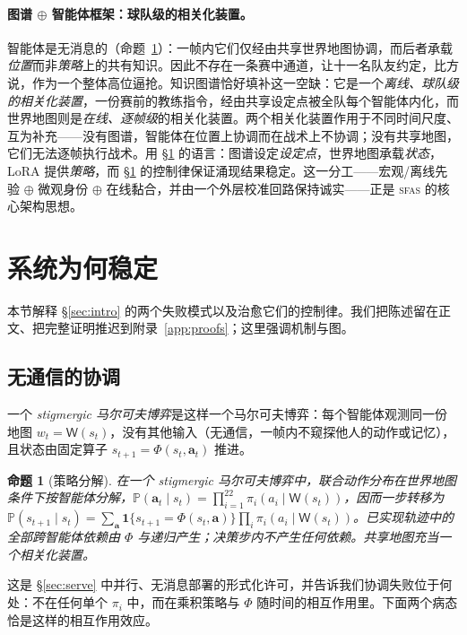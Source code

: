 \documentclass[11pt,UTF8,fontset=fandol]{ctexart}
\newcommand{\Prob}{\mathbb{P}}
\newcommand{\Wmap}{\mathsf{W}}
\newcommand{\sfas}{\textsc{sfas}}
\theoremstyle{plain}
\newtheorem{proposition}{命题}
\theoremstyle{definition}
\theoremstyle{remark}
\begin{document}
\paragraph{图谱 $\oplus$ 智能体框架：球队级的相关化装置。} 智能体是无消息的（命题~\ref{prop:factor}）：一帧内它们仅经由共享世界地图协调，而后者承载\emph{位置}而非\emph{策略}上的共有知识。因此不存在一条赛中通道，让十一名队友约定，比方说，作为一个整体高位逼抢。知识图谱恰好填补这一空缺：它是一个\emph{离线、球队级的相关化装置}，一份赛前的教练指令，经由共享设定点被全队每个智能体内化，而世界地图则是\emph{在线、逐帧级}的相关化装置。两个相关化装置作用于不同时间尺度、互为补充——没有图谱，智能体在位置上协调而在战术上不协调；没有共享地图，它们无法逐帧执行战术。用 \S\ref{sec:why} 的语言：图谱设定\emph{设定点}，世界地图承载\emph{状态}，LoRA 提供\emph{策略}，而 \S\ref{sec:why} 的控制律保证涌现结果稳定。这一分工——宏观/离线先验 $\oplus$ 微观身份 $\oplus$ 在线黏合，并由一个外层校准回路保持诚实——正是 \sfas{} 的核心架构思想。

\section{系统为何稳定}\label{sec:why}

本节解释 \S\ref{sec:intro} 的两个失败模式以及治愈它们的控制律。我们把陈述留在正文、把完整证明推迟到附录~\ref{app:proofs}；这里强调机制与图。

\subsection{无通信的协调}\label{sec:stig}

一个 \emph{stigmergic 马尔可夫博弈}是这样一个马尔可夫博弈：每个智能体观测同一份地图 $w_t=\Wmap(s_t)$，没有其他输入（无通信，一帧内不窥探他人的动作或记忆），且状态由固定算子 $s_{t+1}=\Phi(s_t,\mathbf a_t)$ 推进。

\begin{proposition}[策略分解]\label{prop:factor}
在一个 stigmergic 马尔可夫博弈中，联合动作分布在世界地图条件下按智能体分解，$\Prob(\mathbf a_t\mid s_t)=\prod_{i=1}^{22}\pi_i(a_i\mid\Wmap(s_t))$，因而一步转移为 $\Prob(s_{t+1}\mid s_t)=\sum_{\mathbf a}\mathbf1\{s_{t+1}=\Phi(s_t,\mathbf a)\}\prod_i\pi_i(a_i\mid\Wmap(s_t))$。已实现轨迹中的全部跨智能体依赖由 $\Phi$ 与递归产生；决策步内不产生任何依赖。共享地图充当一个相关化装置。
\end{proposition}

这是 \S\ref{sec:serve} 中并行、无消息部署的形式化许可，并告诉我们协调失败位于何处：不在任何单个 $\pi_i$ 中，而在乘积策略与 $\Phi$ 随时间的相互作用里。下面两个病态恰是这样的相互作用效应。
\end{document}
